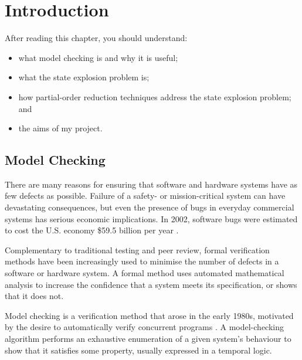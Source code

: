 \documentclass[12pt,a4paper,twoside,openany]{report}
\newenvironment{understandinglist}
	{\begin{itemize} \itemsep 0em}{\end{itemize}}
\begin{document}

\pagestyle{headings}

\chapter{Introduction}
After reading this chapter,
you should understand:
\begin{understandinglist}
	\item what model checking is and why it is useful;
	\item what the state explosion problem is;
	\item how partial-order reduction
	techniques address the state explosion problem; and
	\item the aims of my project.
\end{understandinglist}

\section{Model Checking}

There are many reasons for ensuring that
software and hardware systems have as
few defects as possible. Failure of a
safety- or mission-critical system can
have devastating consequences, but even the
presence of bugs in everyday commercial systems has
serious economic implications. In 2002,
software bugs were estimated to cost
the U.S. economy \$59.5 billion per year \cite{tass02}.

Complementary to traditional testing
and peer review, formal verification methods have been
increasingly used
to minimise the number of defects in a
software or hardware system. A formal
method uses automated
mathematical analysis to increase
the confidence that a system meets its
specification, or shows that it does not.

Model checking is a verification method
that arose in the early 1980s,
motivated by the desire to automatically
verify concurrent programs \cite{cla08}.
A model-checking algorithm performs
an exhaustive enumeration of a given
system's behaviour to show that it
satisfies some property, usually
expressed in a temporal logic.
\end{document}
